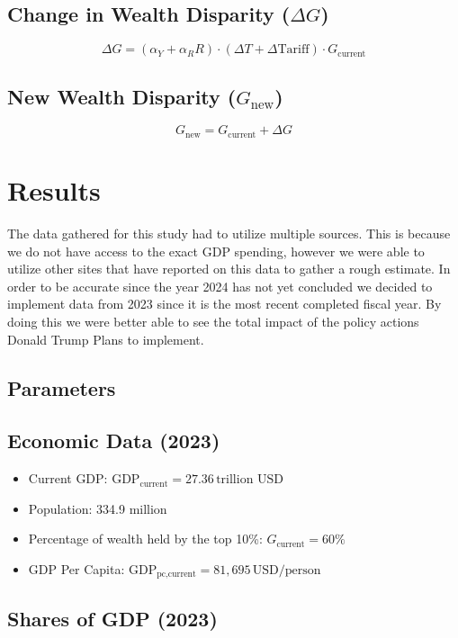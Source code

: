 \documentclass[12pt,letterpaper]{article}
\begin{document}
\subsection*{Change in Wealth Disparity (\( \Delta G \))}

\[
\Delta G = (\alpha_Y + \alpha_RR) \cdot (\Delta T + \Delta \text{Tariff}) \cdot G_{\text{current}}
\]

\subsection*{New Wealth Disparity (\( G_{\text{new}} \))}

\[
G_{\text{new}} = G_{\text{current}} + \Delta G
\]

\section{Results}

The data gathered for this study had to utilize multiple sources. This is because we do not have access to the exact GDP spending, however we were able to utilize other sites that have reported on this data to gather a rough estimate. In order to be accurate since the year 2024 has not yet concluded we decided to implement data from 2023 since it is the most recent completed fiscal year. By doing this we were better able to see the total impact of the policy actions Donald Trump Plans to implement.

\subsection{Parameters}

\subsection*{Economic Data (2023)}

\begin{itemize}
    \item Current GDP: \( \text{GDP}_{\text{current}} = 27.36 \, \text{trillion USD} \)
    \item Population: 334.9 million
    \item Percentage of wealth held by the top 10\%: \( G_{\text{current}} = 60\% \)
    \item GDP Per Capita: \( \text{GDP}_{\text{pc,current}} = 81,695 \, \text{USD/person} \)
\end{itemize}

\subsection*{Shares of GDP (2023)}
\end{document}
